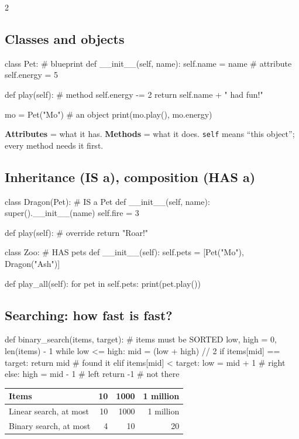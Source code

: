 \documentclass[level=3]{kidscode}
\begin{document}
\small
\begin{multicols}{2}

\subsection{Classes and objects}
\begin{sheetcode}
class Pet:                # blueprint
    def __init__(self, name):
        self.name = name  # attribute
        self.energy = 5

    def play(self):       # method
        self.energy -= 2
        return self.name + " had fun!"

mo = Pet("Mo")            # an object
print(mo.play(), mo.energy)
\end{sheetcode}
\textbf{Attributes} = what it has. \textbf{Methods} = what it does. \texttt{self} means
\enquote{this object}; every method needs it first.

\subsection{Inheritance (IS a), composition (HAS a)}
\begin{sheetcode}
class Dragon(Pet):        # IS a Pet
    def __init__(self, name):
        super().__init__(name)
        self.fire = 3

    def play(self):       # override
        return "Roar!"

class Zoo:                # HAS pets
    def __init__(self):
        self.pets = [Pet("Mo"),
                     Dragon("Ash")]

    def play_all(self):
        for pet in self.pets:
            print(pet.play())
\end{sheetcode}

\subsection{Searching: how fast is fast?}
\begin{sheetcode}
def binary_search(items, target):
    # items must be SORTED
    low, high = 0, len(items) - 1
    while low <= high:
        mid = (low + high) // 2
        if items[mid] == target:
            return mid    # found it
        elif items[mid] < target:
            low = mid + 1  # right
        else:
            high = mid - 1 # left
    return -1             # not there
\end{sheetcode}
{\setlength{\tabcolsep}{4pt}\begin{tabular}{@{}lrrr@{}}
\toprule
Items & 10 & 1000 & 1 million\\ \midrule
Linear search, at most & 10 & 1000 & 1 million\\
Binary search, at most & 4 & 10 & 20\\
\bottomrule
\end{tabular}}


\end{multicols}
\end{document}
